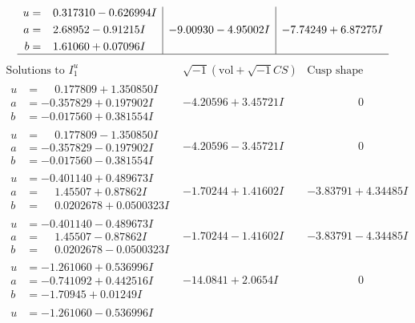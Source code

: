 \documentclass[1p]{elsarticle_modified}
\theoremstyle{definition}
\newcommand{\I}{\sqrt{-1}}
\begin{document}
$$\begin{array}{c|c|c}
\begin{aligned}
u &= \phantom{-}0.317310 - 0.626994 I \\
a &= \phantom{-}2.68952 - 0.91215 I \\
b &= \phantom{-}1.61060 + 0.07096 I\end{aligned}
 & -9.00930 - 4.95002 I & -7.74249 + 6.87275 I\\
 \hline 
 \end{array}$$\newpage$$\begin{array}{c|c|c}  
\text{Solutions to }I^u_{1}& \I (\text{vol} + \sqrt{-1}CS) & \text{Cusp shape}\\
 \hline 
\begin{aligned}
u &= \phantom{-}0.177809 + 1.350850 I \\
a &= -0.357829 + 0.197902 I \\
b &= -0.017560 + 0.381554 I\end{aligned}
 & -4.20596 + 3.45721 I & \phantom{-0.000000 } 0 \\ \hline\begin{aligned}
u &= \phantom{-}0.177809 - 1.350850 I \\
a &= -0.357829 - 0.197902 I \\
b &= -0.017560 - 0.381554 I\end{aligned}
 & -4.20596 - 3.45721 I & \phantom{-0.000000 } 0 \\ \hline\begin{aligned}
u &= -0.401140 + 0.489673 I \\
a &= \phantom{-}1.45507 + 0.87862 I \\
b &= \phantom{-}0.0202678 + 0.0500323 I\end{aligned}
 & -1.70244 + 1.41602 I & -3.83791 + 4.34485 I \\ \hline\begin{aligned}
u &= -0.401140 - 0.489673 I \\
a &= \phantom{-}1.45507 - 0.87862 I \\
b &= \phantom{-}0.0202678 - 0.0500323 I\end{aligned}
 & -1.70244 - 1.41602 I & -3.83791 - 4.34485 I \\ \hline\begin{aligned}
u &= -1.261060 + 0.536996 I \\
a &= -0.741092 + 0.442516 I \\
b &= -1.70945 + 0.01249 I\end{aligned}
 & -14.0841 + 2.0654 I & \phantom{-0.000000 } 0 \\ \hline\begin{aligned}
u &= -1.261060 - 0.536996 I \\

\end{aligned}
\end{array}$$
\end{document}
